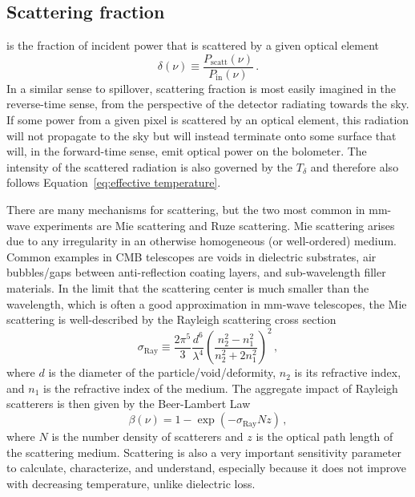 
\subsection{Scattering fraction}
\label{sec:sensitivity_scattering_fraction}

 is the fraction of incident power that is scattered by a given optical element
\begin{equation}
    \delta(\nu) \equiv \frac{P_{\mathrm{scatt}}(\nu)}{P_{\mathrm{in}}(\nu)} \, .
    \label{eq:scattering_fraction_definition}
\end{equation}
In a similar sense to spillover, scattering fraction is most easily imagined in the reverse-time sense, from the perspective of the detector radiating towards the sky. If some power from a given pixel is scattered by an optical element, this radiation will not propagate to the sky but will instead terminate onto some surface that will, in the forward-time sense, emit optical power on the bolometer. The intensity of the scattered radiation is also governed by the  $T_{\delta}$ and therefore also follows Equation~\ref{eq:effective temperature}.

There are many mechanisms for scattering, but the two most common in mm-wave experiments are Mie scattering and Ruze scattering. Mie scattering arises due to any irregularity in an otherwise homogeneous (or well-ordered) medium. Common examples in CMB telescopes are voids in dielectric substrates, air bubbles/gaps between anti-reflection coating layers, and sub-wavelength filler materials. In the limit that the scattering center is much smaller than the wavelength, which is often a good approximation in mm-wave telescopes, the Mie scattering is well-described by the Rayleigh scattering cross section
\begin{equation}
    \sigma_{\mathrm{Ray}} \equiv \frac{2 \pi^{5}}{3} \frac{d^{6}}{\lambda^{4}} \left( \frac{n_{2}^{2} - n_{1}^{2}}{n_{2}^{2} + 2 n_{1}^{2}} \right)^{2} \, ,
    \label{eq:rayleigh_scattering_cross_section}
\end{equation}
where $d$ is the diameter of the particle/void/deformity, $n_{2}$ is its refractive index, and $n_{1}$ is the refractive index of the medium. The aggregate impact of Rayleigh scatterers is then given by the Beer-Lambert Law
\begin{equation}
    \beta(\nu) = 1 - \exp \left( - \sigma_{\mathrm{Ray}} N z \right) \, ,
    \label{eq:beer_lambert_law}
\end{equation}
where $N$ is the number density of scatterers and $z$ is the optical path length of the scattering medium. Scattering is also a very important sensitivity parameter to calculate, characterize, and understand, especially because it does not improve with decreasing temperature, unlike dielectric loss.

